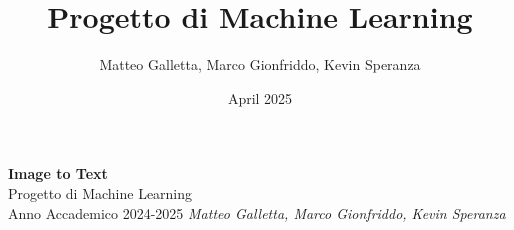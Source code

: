 \documentclass[12pt,a4paper,openany,oneside]{book}
\title{Progetto di Machine Learning}
\author{Matteo Galletta, Marco Gionfriddo, Kevin Speranza}
\date{April 2025}
\begin{document}
\begin{titlepage}
    \centering
    \vspace*{3cm}
    {\Huge \textbf{Image to Text}}\\[2cm]
    {\Large Progetto di Machine Learning}\\[1cm]
    {\Large Anno Accademico 2024-2025}
    \vfill
    \normalsize{\textit{Matteo Galletta, Marco Gionfriddo, Kevin Speranza}}
\end{titlepage}
\tableofcontents
\newpage
{}








\end{document}
